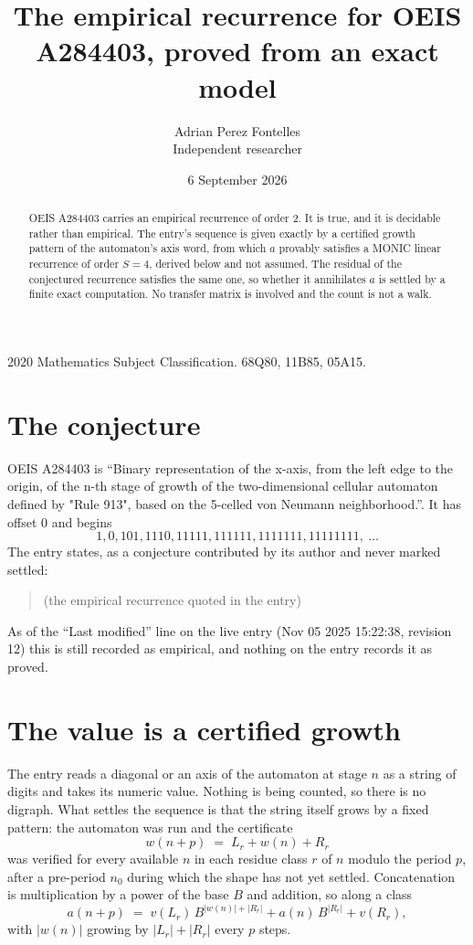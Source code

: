 \documentclass[11pt,a4paper]{article}
\title{The empirical recurrence for OEIS A284403, proved from an exact model}
\author{Adrian Perez Fontelles\\ \small Independent researcher}
\date{6 September 2026}
\theoremstyle{plain}
\theoremstyle{definition}
\begin{document}
\maketitle

\begin{abstract}
OEIS A284403 carries an empirical recurrence of order $2$. It is true, and it is
decidable rather than empirical. The entry's sequence is given exactly by a certified growth pattern of the automaton's axis word, from
which $a$ provably satisfies a MONIC linear recurrence of order $S=4$, derived below and not
assumed. The residual of the conjectured recurrence satisfies the same one, so whether it
annihilates $a$ is settled by a finite exact computation. No transfer matrix is involved and
the count is not a walk.
\end{abstract}

\noindent\small 2020 Mathematics Subject Classification. 68Q80, 11B85, 05A15.\normalsize

\section{The conjecture}

OEIS A284403 is ``Binary representation of the x-axis, from the left edge to the origin, of the n-th stage of growth of the two-dimensional cellular automaton defined by "Rule 913", based on the 5-celled von Neumann neighborhood.''. It has offset $0$ and begins
\[
1, 0, 101, 1110, 11111, 111111, 1111111, 11111111,\ \dots
\]
The entry states, as a conjecture contributed by its author and never marked settled:
\begin{quote}
(the empirical recurrence quoted in the entry)
\end{quote}
As of the ``Last modified'' line on the live entry (Nov 05 2025 15:22:38, revision 12)
this is still recorded as empirical, and nothing on the entry records it as proved.

\section{The value is a certified growth}

The entry reads a diagonal or an axis of the automaton at stage $n$ as a string of digits and takes its
numeric value. Nothing is being counted, so there is no digraph. What settles the sequence is
that the string itself grows by a fixed pattern: the automaton was run and the certificate
\[
w(n+p)\;=\;L_r + w(n) + R_r
\]
was verified for every available $n$ in each residue class $r$ of $n$ modulo the period $p$,
after a pre-period $n_0$ during which the shape has not yet settled. Concatenation is
multiplication by a power of the base $B$ and addition, so along a class
\[
a(n+p)\;=\;v(L_r)\,B^{|w(n)|+|R_r|} + a(n)\,B^{|R_r|} + v(R_r),
\]
with $|w(n)|$ growing by $|L_r|+|R_r|$ every $p$ steps.
\end{document}

